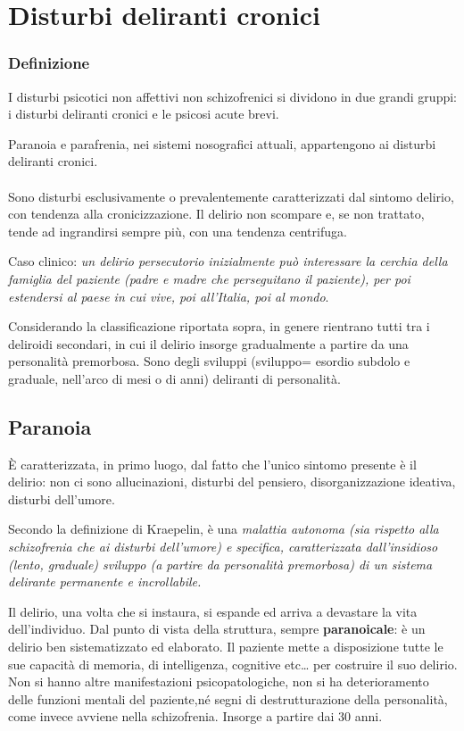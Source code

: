 \section{Disturbi deliranti cronici}

\subsubsection{Definizione}

I disturbi psicotici non affettivi non schizofrenici si dividono in due
grandi gruppi: i disturbi deliranti cronici e le psicosi acute brevi.

Paranoia e parafrenia, nei sistemi nosografici attuali, appartengono ai
disturbi deliranti cronici.
\\\\
Sono disturbi esclusivamente o prevalentemente caratterizzati dal
sintomo delirio, con tendenza alla cronicizzazione. Il delirio non
scompare e, se non trattato, tende ad ingrandirsi sempre più, con una
tendenza centrifuga.

Caso clinico: \emph{un delirio persecutorio inizialmente può interessare
la cerchia della famiglia del paziente (padre e madre che perseguitano
il paziente), per poi estendersi al paese in cui vive, poi all'Italia,
poi al mondo}.

Considerando la classificazione riportata sopra, in genere rientrano
tutti tra i deliroidi secondari, in cui il delirio insorge gradualmente
a partire da una personalità premorbosa. Sono degli sviluppi (sviluppo=
esordio subdolo e graduale, nell'arco di mesi o di anni) deliranti di
personalità.

\subsection{Paranoia}

È caratterizzata, in primo luogo, dal fatto che l'unico sintomo presente
è il delirio: non ci sono allucinazioni, disturbi del pensiero,
disorganizzazione ideativa, disturbi dell'umore.

Secondo la definizione di Kraepelin, è una \emph{malattia autonoma (sia
rispetto alla schizofrenia che ai disturbi dell'umore) e specifica,
caratterizzata dall'insidioso (lento, graduale) sviluppo (a partire da
personalità premorbosa) di un sistema delirante permanente e
incrollabile. }

Il delirio, una volta che si instaura, si espande ed arriva a devastare
la vita dell'individuo. Dal punto di vista della struttura, sempre
\textbf{paranoicale}: è un delirio ben sistematizzato ed elaborato. Il
paziente mette a disposizione tutte le sue capacità di memoria, di
intelligenza, cognitive etc\ldots{} per costruire il suo delirio. Non si
hanno altre manifestazioni psicopatologiche, non si ha deterioramento
delle funzioni mentali del paziente,né segni di destrutturazione della
personalità, come invece avviene nella schizofrenia. Insorge a partire
dai 30 anni.

